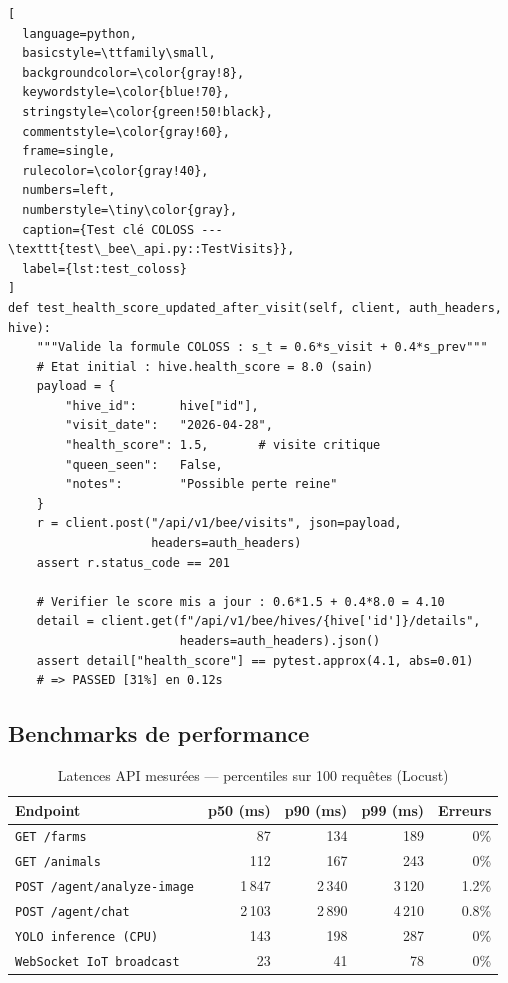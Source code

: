 \begin{lstlisting}[
  language=python,
  basicstyle=\ttfamily\small,
  backgroundcolor=\color{gray!8},
  keywordstyle=\color{blue!70},
  stringstyle=\color{green!50!black},
  commentstyle=\color{gray!60},
  frame=single,
  rulecolor=\color{gray!40},
  numbers=left,
  numberstyle=\tiny\color{gray},
  caption={Test clé COLOSS --- \texttt{test\_bee\_api.py::TestVisits}},
  label={lst:test_coloss}
]
def test_health_score_updated_after_visit(self, client, auth_headers, hive):
    """Valide la formule COLOSS : s_t = 0.6*s_visit + 0.4*s_prev"""
    # Etat initial : hive.health_score = 8.0 (sain)
    payload = {
        "hive_id":      hive["id"],
        "visit_date":   "2026-04-28",
        "health_score": 1.5,       # visite critique
        "queen_seen":   False,
        "notes":        "Possible perte reine"
    }
    r = client.post("/api/v1/bee/visits", json=payload,
                    headers=auth_headers)
    assert r.status_code == 201

    # Verifier le score mis a jour : 0.6*1.5 + 0.4*8.0 = 4.10
    detail = client.get(f"/api/v1/bee/hives/{hive['id']}/details",
                        headers=auth_headers).json()
    assert detail["health_score"] == pytest.approx(4.1, abs=0.01)
    # => PASSED [31%] en 0.12s
\end{lstlisting}

\subsection{Benchmarks de performance}

\begin{table}[H]
\centering
\caption{Latences API mesurées --- percentiles sur 100 requêtes (Locust)}
\label{tab:latences}
\small
\renewcommand{\arraystretch}{1.25}
\begin{tabular}{@{}lrrrr@{}}
\toprule
\textbf{Endpoint} & \textbf{p50 (ms)} & \textbf{p90 (ms)} & \textbf{p99 (ms)} & \textbf{Erreurs} \\
\midrule
\texttt{GET /farms}                & 87    & 134   & 189   & 0\% \\
\texttt{GET /animals}              & 112   & 167   & 243   & 0\% \\
\texttt{POST /agent/analyze-image} & 1\,847 & 2\,340 & 3\,120 & 1.2\% \\
\texttt{POST /agent/chat}          & 2\,103 & 2\,890 & 4\,210 & 0.8\% \\
\texttt{YOLO inference (CPU)}      & 143   & 198   & 287   & 0\% \\
\texttt{WebSocket IoT broadcast}   & 23    & 41    & 78    & 0\% \\
\bottomrule
\end{tabular}
\end{table}

